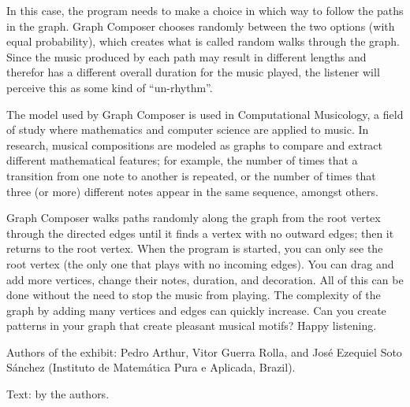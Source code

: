 In this case, the program needs to make a choice in which way to follow the paths in the graph. Graph Composer chooses randomly between the two options (with equal probability), which creates what is called random walks through the graph. Since the music produced by each path may result in different lengths and therefor has a different overall duration for the music played, the listener will perceive this as some kind of ``un-rhythm''.

The model used by Graph Composer is used in Computational Musicology, a field of study where mathematics and computer science are applied to music. In research, musical compositions are modeled as graphs to compare and extract different mathematical features; for example, the number of times that a transition from one note to another is repeated, or the number of times that three (or more) different notes appear in the same sequence, amongst others.

Graph Composer walks paths randomly along the graph from the root vertex through the directed edges until it finds a vertex with no outward edges; then it returns to the root vertex. When the program is started, you can only see the root vertex (the only one that plays with no incoming edges). You can drag and add more vertices, change their notes, duration, and decoration. All of this can be done without the need to stop the music from playing. The complexity of the graph by adding many vertices and edges can quickly increase. Can you create patterns in your graph that create pleasant musical motifs? Happy listening.

\begin{sectcredits}
\item[Authors of the exhibit:] Pedro Arthur, Vitor Guerra Rolla, and José Ezequiel Soto Sánchez (Instituto de Matemática Pura e Aplicada, Brazil). 

\item[Text:] by the authors.

\end{sectcredits}